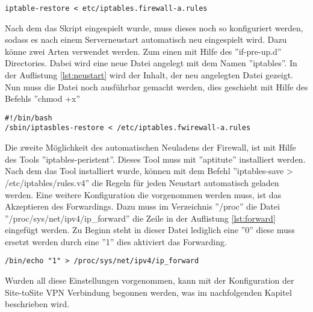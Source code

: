 \begin{lstlisting}[caption={Einspielen des Firewallskriptes der Firma a},label=lst:fwrestorea]
iptable-restore < etc/iptables.firewall-a.rules
\end{lstlisting}
\vspace{\baselineskip}
Nach dem das Skript eingespielt wurde, muss dieses noch so konfiguriert werden, sodass es nach einem Serverneustart automatisch neu eingespielt wird. Dazu könne zwei Arten verwendet werden. Zum einen mit Hilfe des ''if-pre-up.d'' Directories. Dabei wird eine neue Datei angelegt mit dem Namen ''iptables''. In der Auflistung \ref{lst:neustart} wird der Inhalt, der neu angelegten Datei gezeigt. Nun muss die Datei noch ausführbar gemacht werden, dies geschieht mit Hilfe des Befehls ''chmod +x''
\newline
\lstset{
	basicstyle=\footnotesize, frame=tb,
	xleftmargin=.2\textwidth, xrightmargin=.2\textwidth
}
\begin{lstlisting}[caption={Automatisches Laden des Iptablesskriptes bei Serverneustart},label=lst:neustart]
#!/bin/bash
/sbin/iptasbles-restore < /etc/iptables.fwirewall-a.rules
\end{lstlisting}
\vspace{\baselineskip}
Die zweite Möglichkeit des automatischen Neuladens der Firewall, ist mit Hilfe des Tools ''iptables-peristent''. Dieses Tool muss mit ''aptitute'' installiert werden. Nach dem das Tool installiert wurde, können mit dem Befehl ''iptables-save > /etc/iptables/rules.v4'' die Regeln für jeden Neustart automatisch geladen werden. 
\newline 
Eine weitere Konfiguration die vorgenommen werden muss, ist das Akzeptieren des Forwardings. Dazu muss im Verzeichnis ''/proc'' die Datei ''/proc/sys/net/ipv4/ip\_forward'' die Zeile in der Auflistung \ref{lst:forward} eingefügt werden. Zu Beginn steht in dieser Datei lediglich eine ''0'' diese muss ersetzt werden durch eine ''1'' dies aktiviert das Forwarding.\newline
\lstset{
	basicstyle=\footnotesize, frame=tb,
	xleftmargin=.2\textwidth, xrightmargin=.2\textwidth
}
\begin{lstlisting}[caption={Forwarding aktivieren},label=lst:forward]
/bin/echo "1" > /proc/sys/net/ipv4/ip_forward
\end{lstlisting}
\vspace{\baselineskip}
Wurden all diese Einstellungen vorgenommen, kann  mit der Konfiguration der Site-toSite VPN Verbindung begonnen werden, was im nachfolgenden Kapitel beschrieben wird.



